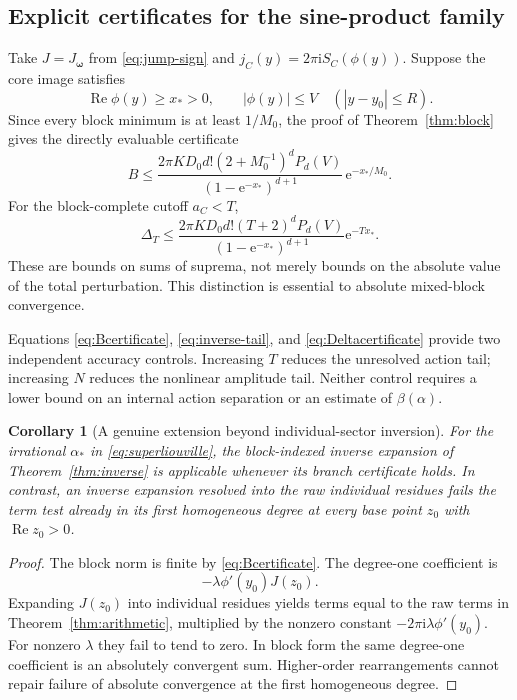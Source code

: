 \documentclass[11pt,a4paper]{article}
\numberwithin{equation}{section}
\newtheorem{corollary}[theorem]{Corollary}
\theoremstyle{definition}
\theoremstyle{remark}
\newcommand{\ii}{\mathrm i}
\newcommand{\e}{\mathrm e}
\newcommand{\re}{\operatorname{Re}}
\newcommand{\bw}{\boldsymbol\omega}
\begin{document}
\subsection{Explicit certificates for the sine-product family}
Take $J=J_{\bw}$ from \eqref{eq:jump-sign} and
$j_C(y)=2\pi\ii S_C(\phi(y))$. Suppose the core image satisfies
\begin{equation}
 \re\phi(y)\ge x_*>0,\qquad |\phi(y)|\le V
 \quad (|y-y_0|\le R).
 \label{eq:core-image}
\end{equation}
Since every block minimum is at least $1/M_0$, the proof of
Theorem~\ref{thm:block} gives the directly evaluable certificate
\begin{equation}
 B\le
 \frac{2\pi KD_0d!(2+M_0^{-1})^dP_d(V)}
      {(1-\e^{-x_*})^{d+1}}\,
       \e^{-x_*/M_0}.
 \label{eq:Bcertificate}
\end{equation}
For the block-complete cutoff $a_C<T$,
\begin{equation}
 \Delta_T\le
 \frac{2\pi KD_0d!(T+2)^dP_d(V)}
      {(1-\e^{-x_*})^{d+1}}\e^{-Tx_*}.
 \label{eq:Deltacertificate}
\end{equation}
These are bounds on sums of suprema, not merely bounds on the absolute
value of the total perturbation. This distinction is essential to
absolute mixed-block convergence.

Equations \eqref{eq:Bcertificate}, \eqref{eq:inverse-tail}, and
\eqref{eq:Deltacertificate} provide two independent accuracy controls.
Increasing $T$ reduces the unresolved action tail; increasing $N$ reduces
the nonlinear amplitude tail. Neither control requires a lower bound on
an internal action separation or an estimate of $\beta(\alpha)$.

\begin{corollary}[A genuine extension beyond individual-sector inversion]
\label{cor:inverse-obstruction}
For the irrational $\alpha_*$ in \eqref{eq:superliouville}, the
block-indexed inverse expansion of Theorem~\ref{thm:inverse} is applicable
whenever its branch certificate holds. In contrast, an inverse expansion
resolved into the raw individual residues fails the term test already
in its first homogeneous degree at every base point $z_0$ with
$\re z_0>0$.
\end{corollary}
\begin{proof}
The block norm is finite by \eqref{eq:Bcertificate}. The degree-one
coefficient is
\begin{equation}
 -\lambda\phi'(y_0)J(z_0).
 \label{eq:first-inverse}
\end{equation}
Expanding $J(z_0)$ into individual residues yields terms equal to the
raw terms in Theorem~\ref{thm:arithmetic}, multiplied by the nonzero
constant $-2\pi\ii\lambda\phi'(y_0)$. For nonzero $\lambda$ they fail
to tend to zero. In block form the same degree-one coefficient is an
absolutely convergent sum. Higher-order rearrangements cannot repair
failure of absolute convergence at the first homogeneous degree.
\end{proof}
\end{document}
